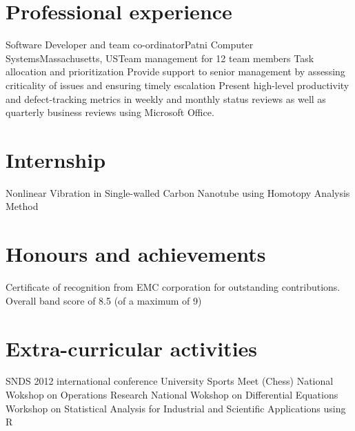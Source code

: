 \documentclass [a4paper,11pt]{moderncv}
\begin{document}
\section{Professional experience}
 {Software Developer and team co-ordinator}{Patni Computer Systems}{Massachusetts, US}{}{Team management for 12 team members \newline{} Task allocation and prioritization \newline{} Provide support to senior management by assessing criticality of issues and ensuring timely escalation \newline{} Present high-level productivity and defect-tracking metrics in weekly and monthly status reviews as well as quarterly business reviews using Microsoft Office.}

\section {Internship}
 {Nonlinear Vibration in Single-walled Carbon Nanotube using Homotopy Analysis Method}

\section {Honours and achievements}
\cvline {} {Certificate of recognition from EMC corporation for outstanding contributions.}
 {Overall band score of 8.5 (of a maximum of 9)}

\section {Extra-curricular activities}
 {SNDS 2012 international conference}
 {University Sports Meet (Chess)}
 {National Wokshop on Operations Research}
 {National Wokshop on Differential Equations}
 {Workshop on Statistical Analysis for Industrial and Scientific Applications using R}
\end{document}
